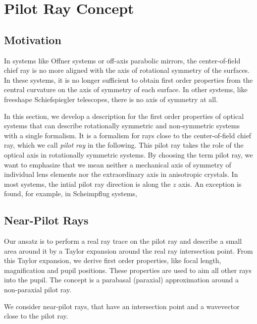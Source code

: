 \documentclass[12pt,a4paper,twoside,openright,BCOR10mm,headsepline,titlepage,abstracton,chapterprefix,final]{scrreprt}
\begin{document}
\section{Pilot Ray Concept}

\subsection{Motivation}

In systems like Offner systems or off-axis parabolic mirrors, the center-of-field chief ray is no more aligned with the axis of rotational symmetry of the surfaces.
In these systems, it is no longer sufficient to obtain first order properties from the central curvature on the axis of symmetry of each surface.
In other systems, like freeshape Schiefspiegler telescopes, there is no axis of symmetry at all.

In this section, we develop a description for the first order properties of optical systems that can describe rotationally symmetric and non-symmetric systems with a single formalism.
It is a formalism for rays close to the center-of-field chief ray, which we call \emph{pilot ray} in the following.
This pilot ray takes the role of the optical axis in rotationally symmetric systems. 
By choosing the term pilot ray, we want to emphasize that we mean neither a mechanical axis of symmetry of individual lens elements nor the extraordinary axis in anisotropic crystals.
In most systems, the intial pilot ray direction is along the $z$ axis. 
An exception is found, for example, in Scheimpflug systems,

\subsection{Near-Pilot Rays}
Our ansatz is to perform a real ray trace on the pilot ray and describe a small area around it by a Taylor expansion around the real ray intersection point.
From this Taylor expansion, we derive first order properties, like focal length, magnification and pupil positions.
These properties are used to aim all other rays into the pupil.
The concept is a parabasal (paraxial) approximation around a non-paraxial pilot ray.

We consider near-pilot rays, that have an intersection point and a wavevector close to the pilot ray.
\end{document}

